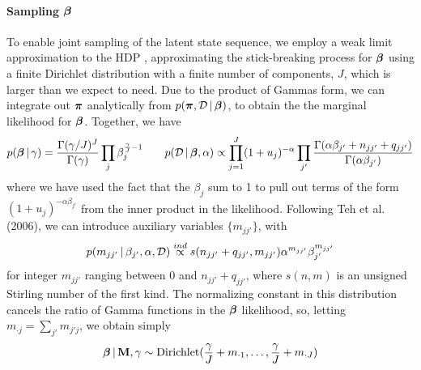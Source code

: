 \paragraph{Sampling \texorpdfstring{$\boldsymbol{\beta}$}{beta}}
\label{sec:sampling-bbeta}
To enable joint sampling of the latent state sequence, we employ a
weak limit approximation to the HDP \cite{johnson2013bayesian}, approximating the stick-breaking
process for $\boldsymbol{\beta}$ using a finite Dirichlet distribution with a
finite number of components, $J$, which is larger than we expect to
need.  Due to the product of Gammas form, we can integrate out $\boldsymbol{\pi}$ 
analytically from $p(\boldsymbol{\pi}, \mathcal{D} \, \vert \, \boldsymbol{\beta})$, to obtain the
the marginal likelihood for $\boldsymbol{\beta}$.  Together, we have
\begin{align}
\label{eq:beta-prior-likelihood}
  p(\boldsymbol{\beta} \, \vert \, \gamma) = \frac{\Gamma(\gamma /
    J)^J}{\Gamma(\gamma)} \prod_{j} \beta_{j}^{\frac{\gamma}{J} - 1} \qquad
  p(\mathcal{D} \, \vert \, \boldsymbol{\beta}, \alpha) \propto
  \prod_{j=1}^J (1+u_j)^{-\alpha} \prod_{j'}
    \frac{\Gamma(\alpha\beta_{j'} + n_{jj'} +
    q_{jj'})}{\Gamma(\alpha\beta_{j'})} 
\end{align}
 where we have used the fact that the $\beta_j$ sum to 1 to pull out
 terms of the form $(1 + u_j)^{-\alpha\beta_{j'}}$ from the inner
 product in the likelihood.  Following Teh et al. (2006), 
we can introduce auxiliary variables $\{m_{jj'}\}$, with
\begin{equation}
  \label{eq:m-distribution}
  p(m_{jj'} \, \vert \, \beta_{j'}, \alpha, \mathcal{D}) \stackrel{ind}{\propto}
  s(n_{jj'} + q_{jj'}, m_{jj'}) \alpha^{m_{jj'}}
    \beta_{j'}^{m_{jj'}}
\end{equation}
for integer $m_{jj'}$ ranging between $0$ and $n_{jj'} + q_{jj'}$,
where $s(n,m)$ is an unsigned Stirling number of the first kind.
The normalizing constant in this distribution cancels the ratio of
Gamma functions in the $\boldsymbol{\beta}$ likelihood, so, letting $m_{\cdot j} =
\sum_{j'} m_{j'j}$, we obtain simply
\begin{equation}
  \label{eq:beta-posterior}
  \boldsymbol{\beta} \, \vert \, \mathbf{M}, \gamma \sim \mathrm{Dirichlet}(\frac{\gamma}{J} +
  m_{\cdot 1}, \dots, \frac{\gamma}{J} + m_{\cdot J})
\end{equation}

